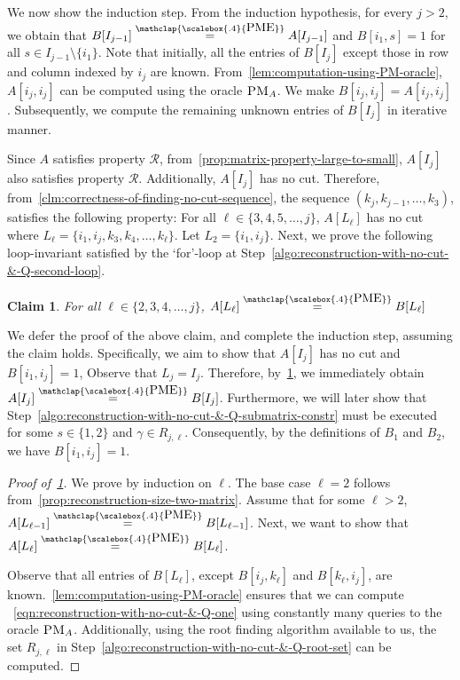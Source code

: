 \documentclass[11pt,letterpaper]{article}
\newtheorem{claim}{Claim}[section]
\newcommand{\PME}{\stackrel{\mathclap{\scalebox{.4}{\mbox{PME}}}}{=}}
\newcommand{\prop}{\mathcal{R}}
\newcommand{\PMoracle}[1]{\textsc{PM}_{#1}}
\begin{document}
{{{We now show the induction step. From the induction hypothesis, for every $j>2$, we obtain that $B[I_{j-1}]\PME A[I_{j-1}]$ and $B[i_1, s]=1$ for all $s\in I_{j-1}\setminus \{i_1\}$. Note that initially, all the entries of $B[I_j]$ except those in row and column indexed by $i_j$ are known. From~\cref{lem:computation-using-PM-oracle}, $A[i_j, i_j]$ can be computed using the oracle $\PMoracle{A}$. We make $B[i_j,i_j]=A[i_j, i_j]$. Subsequently, we compute the remaining unknown entries of $B[I_j]$ in iterative manner.

Since $A$ satisfies property $\prop$, from~\cref{prop:matrix-property-large-to-small}, $A[I_j]$ also satisfies property $\prop$. Additionally, $A[I_j]$ has no cut. Therefore, from~\cref{clm:correctness-of-finding-no-cut-sequence}, the sequence $(k_j, k_{j-1}, \ldots, k_3)$, satisfies the following property: For all $\ell\in\{3,4, 5, \ldots, j\}$, $A[L_\ell]$ has no cut where $L_\ell=\{i_1, i_j, k_3, k_4, \ldots, k_\ell\}$. Let $L_2=\{i_1, i_j\}$.  Next, we prove the following loop-invariant satisfied by the `for'-loop at Step~\ref{algo:reconstruction-with-no-cut-&-Q-second-loop}.
\begin{claim}
\label{clm:reconstruction-with-no-cut-&-Q-loop-invariant}
For all $\ell\in\{2,3,4, \ldots, j\}$, $A[L_\ell]\PME B[L_\ell]$
\end{claim}

We defer the proof of the above claim, and complete the induction step, assuming the claim holds. Specifically, we aim to show that $A[I_j]$ has no cut and $B[i_1, i_j]=1$,  Observe that $L_j=I_j$. Therefore, by~\cref{clm:reconstruction-with-no-cut-&-Q-loop-invariant}, we immediately obtain $A[I_j]\PME B[I_j]$. Furthermore, we will later show that Step~\ref{algo:reconstruction-with-no-cut-&-Q-submatrix-constr} must be executed for some $s\in\{1,2\}$ and $\gamma\in R_{j,\ell}$. Consequently, by the definitions of $B_1$ and $B_2$, we have $B[i_1, i_j]=1$. 

\begin{proof}[Proof of~\cref{clm:reconstruction-with-no-cut-&-Q-loop-invariant}]
We prove by induction on $\ell$. The base case $\ell=2$ follows from~\cref{prop:reconstruction-size-two-matrix}.  Assume that for some $\ell>2$, $A[L_{\ell-1}]\PME B[L_{\ell-1}]$. Next, we want to show that $A[L_{\ell}]\PME B[L_\ell]$.

Observe that all entries of $B[L_\ell]$, except $B[i_j, k_\ell]$ and $B[k_\ell, i_j]$, are known.~\cref{lem:computation-using-PM-oracle} ensures that we can compute ~\cref{eqn:reconstruction-with-no-cut-&-Q-one} using constantly many queries to the oracle $\PMoracle{A}$. Additionally, using the root finding algorithm available to us, the set $R_{j, \ell}$ in Step~\ref{algo:reconstruction-with-no-cut-&-Q-root-set} can be computed.


\end{proof}}}}
\end{document}
